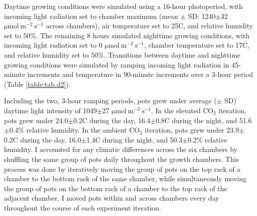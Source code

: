 Daytime growing conditions were simulated using a 16-hour photoperiod, with incoming light radiation set to chamber maximum (mean $\pm$ SD: 1240$\pm$32 $\mathrm{\mu mol\ m^{-2}\ s^{-1}}$ across chambers), air temperature set to 25\textdegree{}C, and relative humidity set to 50\%. The remaining 8 hours simulated nighttime growing conditions, with incoming light radiation set to 0 $\mathrm{\mu mol\ m^{-2}\ s^{-1}}$, chamber temperature set to 17\textdegree{}C, and relative humidity set to 50\%. Transitions between daytime and nighttime growing conditions were simulated by ramping incoming light radiation in 45-minute increments and temperature in 90-minute increments over a 3-hour period (Table \ref{table:tab.d2}).
    
Including the two, 3-hour ramping periods, pots grew under average ($\pm$ SD) daytime light intensity of 1049$\pm$27 $\mathrm{\mu mol\ m^{-2}\ s^{-1}}$. In the elevated CO$_2$ iteration, pots grew under 24.0$\pm$0.2\textdegree{}C during the day, 16.4$\pm$0.8\textdegree{}C during the night, and 51.6$\pm$0.4\% relative humidity. In the ambient CO$_2$ iteration, pots grew under 23.9$\pm$0.2\textdegree{}C during the day, 16.0$\pm$1.4\textdegree{}C during the night, and 50.3$\pm$0.2\% relative humidity. I accounted for any climatic differences across the six chambers by shuffling the same group of pots daily throughout the growth chambers. This process was done by iteratively moving the group of pots on the top rack of a chamber to the bottom rack of the same chamber, while simultaneously moving the group of pots on the bottom rack of a chamber to the top rack of the adjacent chamber. I moved pots within and across chambers every day throughout the course of each experiment iteration.

